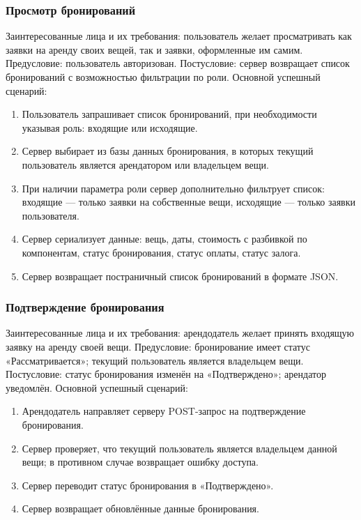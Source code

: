 \subsubsection{Просмотр бронирований}
Заинтересованные лица и их требования: пользователь желает просматривать как заявки на аренду своих вещей, так и заявки, оформленные им самим.
Предусловие: пользователь авторизован.
Постусловие: сервер возвращает список бронирований с возможностью фильтрации по роли.
Основной успешный сценарий:
\begin{enumerate}
\item Пользователь запрашивает список бронирований, при необходимости указывая роль: входящие или исходящие.
\item Сервер выбирает из базы данных бронирования, в которых текущий пользователь является арендатором или владельцем вещи.
\item При наличии параметра роли сервер дополнительно фильтрует список: входящие — только заявки на собственные вещи, исходящие — только заявки пользователя.
\item Сервер сериализует данные: вещь, даты, стоимость с разбивкой по компонентам, статус бронирования, статус оплаты, статус залога.
\item Сервер возвращает постраничный список бронирований в формате JSON.
\end{enumerate}

\subsubsection{Подтверждение бронирования}
Заинтересованные лица и их требования: арендодатель желает принять входящую заявку на аренду своей вещи.
Предусловие: бронирование имеет статус «Рассматривается»; текущий пользователь является владельцем вещи.
Постусловие: статус бронирования изменён на «Подтверждено»; арендатор уведомлён.
Основной успешный сценарий:
\begin{enumerate}
\item Арендодатель направляет серверу POST-запрос на подтверждение бронирования.
\item Сервер проверяет, что текущий пользователь является владельцем данной вещи; в противном случае возвращает ошибку доступа.
\item Сервер переводит статус бронирования в «Подтверждено».
\item Сервер возвращает обновлённые данные бронирования.
\end{enumerate}

